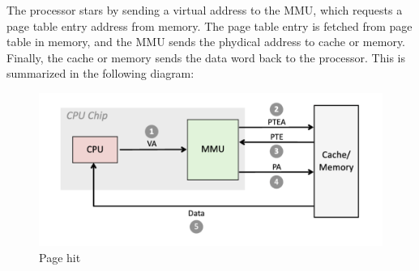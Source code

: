 \documentclass[toc]{../cs-classes/cs-classes}
\begin{document}
The processor stars by sending a virtual address to the MMU, which requests a page table entry address from memory. The page table entry is fetched from page table in memory, and the MMU sends the phydical address to cache or memory. Finally, the cache or memory sends the data word back to the processor. This is summarized in the following diagram:
\begin{figure}[H]
    \centering
    \includegraphics[scale=0.6]{images/MMU.png}
    \caption{Page hit}
\end{figure}
\end{document}
